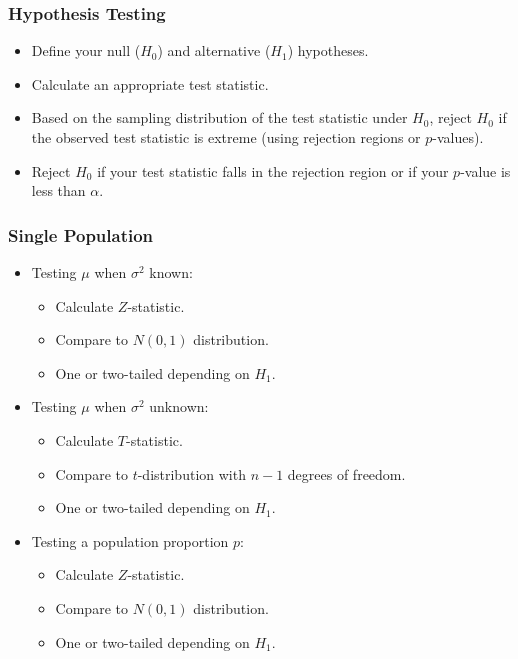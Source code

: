 \documentclass[12pt]{beamer}
\begin{document}
\begin{frame}
	\frametitle{Hypothesis Testing}
	
	\begin{itemize}[label={\color{blue}$\blacktriangleright$}]
		\item Define your null ($H_0$) and alternative ($H_1$) hypotheses.
		
		\item Calculate an appropriate test statistic.
		
		\item Based on the sampling distribution of the test statistic under $H_0$, reject $H_0$ if the observed test statistic is extreme (using rejection regions or $p$-values).
		
		\item Reject $H_0$ if your test statistic falls in the rejection region or if your $p$-value is less than $\alpha$.
	\end{itemize}
	
\end{frame}
\begin{frame}
	\frametitle{Single Population}
	
	\begin{itemize}[label={\color{blue}$\blacktriangleright$}]
		\item Testing $\mu$ when $\sigma^2$ known:
		\begin{itemize}[label={\color{blue}$\blacktriangleright$}]
			\item Calculate $Z$-statistic.
			\item Compare to $N(0,1)$ distribution.
			\item One or two-tailed depending on $H_1$.
		\end{itemize}
		
		\item Testing $\mu$ when $\sigma^2$ unknown:
		\begin{itemize}[label={\color{blue}$\blacktriangleright$}]
			\item Calculate $T$-statistic.
			\item Compare to $t$-distribution with $n-1$ degrees of freedom.
			\item One or two-tailed depending on $H_1$.
		\end{itemize}
		
		\item Testing a population proportion $p$:
		\begin{itemize}[label={\color{blue}$\blacktriangleright$}]
			\item Calculate $Z$-statistic.
			\item Compare to $N(0,1)$ distribution.
			\item One or two-tailed depending on $H_1$.
		\end{itemize}
	\end{itemize}
	
\end{frame}
\end{document}
